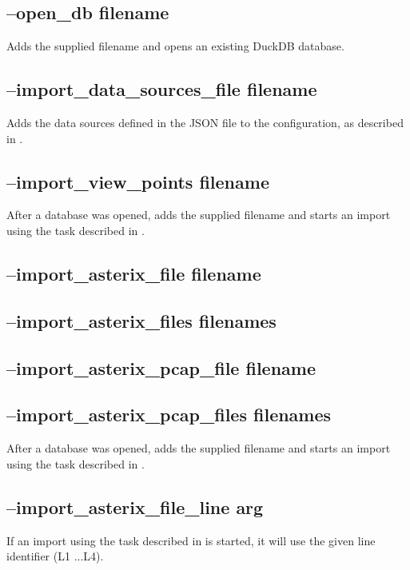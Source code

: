 \subsection{--open\_db filename}

Adds the supplied filename and opens an existing DuckDB database.

\subsection{--import\_data\_sources\_file filename}

Adds the data sources defined in the JSON file to the configuration, as described in .

\subsection{--import\_view\_points filename}

After a database was opened, adds the supplied filename and starts an import using the task described in .
 
\subsection{--import\_asterix\_file filename}
\subsection{--import\_asterix\_files filenames}
\subsection{--import\_asterix\_pcap\_file filename}
\subsection{--import\_asterix\_pcap\_files filenames}

After a database was opened, adds the supplied filename and starts an import using the task described in .

\subsection{--import\_asterix\_file\_line arg}

If an import using the task described in  is started, it will use the given line identifier (L1 ...L4).


